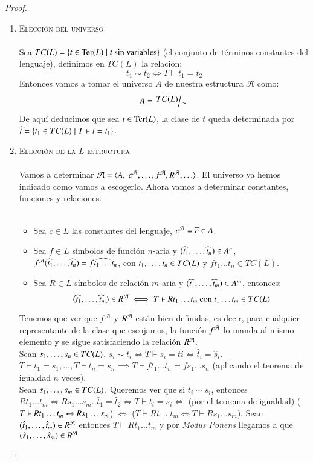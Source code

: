 \begin{proof}$ $
    \begin{enumerate}[(1)]
        \item \textsc{Elección del universo}\\\\
        Sea $TC(L) = \left\{t \in \mathrm{Ter}(L) \mid t \text{ sin variables}\right\}$ (el conjunto de términos constantes del lenguaje), definimos en $TC(L)$ la relación:
        $$
            t_1 \sim t_2 \iff T \vdash t_1 = t_2
        $$
        Entonces vamos a tomar el universo $A$ de nuestra estructura $\mathcal{A}$ como:
        $$
            A = \quo{TC(L)}{\sim}
        $$
        De aquí deducimos que sea $t \in \mathrm{Ter}(L)$, la clase de $t$ queda determinada por $\widehat t = \left\{t_1 \in TC(L) \mid T \vdash t = t_1\right\}$.

        \item \textsc{Elección de la $L$-estructura}\\\\
        Vamos a determinar $\mathcal{A} = \langle A,\ c^{\mathcal{A}}, \ldots, f^{\mathcal{A}}, R^{\mathcal{A}}, \ldots\rangle$. El universo ya hemos indicado como vamos a escogerlo. Ahora vamos a determinar constantes, funciones y relaciones.\\\\
        \begin{itemize}
            \item Sea $c\in L$ las constantes del lenguaje, $c^{\mathcal{A}} = \widehat c \in A$.
            \item Sea $f\in L$ símbolos de función $n$-aria y $({\widehat t}_{1}, \ldots, {\widehat t}_{n}) \in A^n$, $f^{\mathcal{A}} ({\widehat t}_{1}, \ldots, {\widehat t}_{n}) = \widehat{f t_1 \ldots t_n}$, con ${t}_{1}, \ldots, {t}_{n} \in TC(L)$ y $f t_1 \ldots t_n \in TC(L)$.
            \item Sea $R \in L$ símbolos de relación $m$-aria y $({\widehat t}_{1}, \ldots, {\widehat t}_{m}) \in A^m$, entonces:
                $$
                    ({\widehat t}_{1}, \ldots, {\widehat t}_{m}) \in R^{\mathcal{A}} \iff T \vdash R t_1 \ldots t_m \text{ con } t_1 \ldots t_m \in TC(L)
                $$
        \end{itemize}
        Tenemos que ver que $f^{\mathcal{A}}$ y $R^{\mathcal{A}}$ están bien definidas, es decir, para cualquier representante de la clase que escojamos, la función $f^{\mathcal{A}}$ lo manda al mismo elemento y se sigue satisfaciendo la relación $R^{\mathcal{A}}$.\\
        Sean ${s}_{1}, \ldots, {s}_{n} \in TC(L)$, $s_i \sim t_i \iff T \vdash s_i = ti \iff \widehat t_i = \widehat s_i$.
        $T \vdash t_1 = s_1, \ldots, T \vdash t_n = s_n \implies T \vdash f t_1 \ldots t_n = f s_1 \ldots s_n$ (aplicando el teorema de igualdad $n$ veces).\\
        Sean ${s}_{1}, \ldots, {s}_{m} \in TC(L)$. Queremos ver que si $t_i \sim s_i$, entonces $R t_1 \ldots t_m \iff R s_1 \ldots s_m$.
        $\hat t_1 = \hat t_2 \iff T\vdash t_i = s_i \iff$ (por el teorema de igualdad) ($T \vdash R t_1 \ldots t_m \leftrightarrow R s_1 \ldots s_m$) $\iff$ ($T \vdash R t_1 \ldots t_m \iff T \vdash R s_1 \ldots s_m$). Sean $({\hat t}_{1}, \ldots, {\hat t}_{m}) \in R^{\mathcal{A}}$ entonces $T \vdash R t_1 \ldots t_m$ y por \textit{Modus Ponens} llegamos a que $({\hat s}_{1}, \ldots, {\hat s}_{m}) \in R^{\mathcal{A}}$\\


\end{enumerate}
\end{proof}

